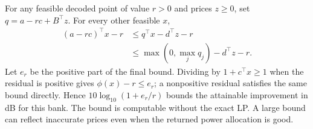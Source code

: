 For any feasible decoded point of value $r>0$ and prices $z\ge0$, set $q=a-rc+B^\top z$. For every other feasible $x$,
\begin{align}
 (a-rc)^\top x-r
 &\le q^\top x-d^\top z-r\\
 &\le \max(0,\max_j q_j)-d^\top z-r .
\end{align}
Let $e_r$ be the positive part of the final bound. Dividing by $1+c^\top x\ge1$ when the residual is positive gives $\phi(x)-r\le e_r$; a nonpositive residual satisfies the same bound directly. Hence $10\log_{10}(1+e_r/r)$ bounds the attainable improvement in dB for this bank. The bound is computable without the exact LP. A large bound can reflect inaccurate prices even when the returned power allocation is good.
